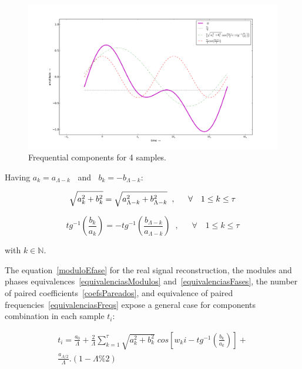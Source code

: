 \documentclass[
 aip,
 jmp,
 amsmath,amssymb,
 reprint,
]{revtex4-1}
\begin{document}
\begin{figure}[h!]
    \centering
        \includegraphics[width=\columnwidth]{figures/amostras4__}
    \caption{Frequential components for 4 samples.}
        \label{fig:amostras4}
\end{figure}

Having $a_k = a_{\Lambda -k}\;\;$ and $\;\;b_k = - b_{\Lambda -k}$:

\begin{equation}\label{equivalenciasModulos}
\sqrt{a_k^2 + b_k^2} = \sqrt{a_{\Lambda - k}^2 + b_{\Lambda -k}^2} \;\;, \quad \;\; \forall \quad 1 \leq k \leq \tau  \\
\end{equation}

\begin{equation}\label{equivalenciasFases}
tg^{-1}\left(\frac{b_k}{a_k}\right)=-tg^{-1}\left(\frac{b_{\Lambda -k}}{a_{\Lambda - k}}\right)\;\;,\quad \;\; \forall \quad 1 \leq k \leq \tau
\end{equation}

with $k \in \mathbb{N}$.

The equation~\ref{moduloEfase} for the real signal reconstruction, the modules and phases equivalences~\ref{equivalenciasModulos} and~\ref{equivalenciasFases}, the number of paired coefficients~\ref{coefsPareados}, and equivalence of paired frequencies~\ref{equivalenciasFreqs} expose a general case for components combination in each sample $t_i$:

\begin{multline}\label{eq:reconsCompleta}
t_i = \frac{a_0}{\Lambda} + \frac{2}{\Lambda}\sum_{k=1}^{\tau}\sqrt{a_k^2 + b_k^2} \; cos\left[w_k i - tg^{-1}\left(\frac{b_k}{a_k}\right)\right]+ \\ \frac{ a_{\Lambda/2}}{\Lambda}.(1-\Lambda\% 2)
\end{multline}
\end{document}
